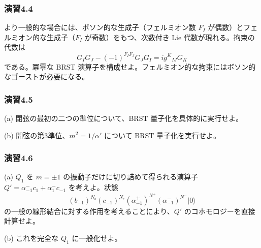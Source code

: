 \subsubsection*{演習4.4}\label{ex:4.4}
より一般的な場合には、ボソン的な生成子（フェルミオン数 $F_I$ が偶数）とフェルミオン的な生成子（$F_I$ が奇数）をもつ、次数付き Lie 代数が現れる。拘束の代数は
\[
G_IG_J-(-1)^{F_IF_J}G_JG_I=ig^K{}_{IJ}G_K
\]
である。冪零な BRST 演算子を構成せよ。フェルミオン的な拘束にはボソン的なゴーストが必要になる。

\subsubsection*{演習4.5}\label{ex:4.5}
(a) 閉弦の最初の二つの準位について、BRST 量子化を具体的に実行せよ。

(b) 開弦の第3準位、$m^2=1/\alpha'$ について BRST 量子化を実行せよ。

\subsubsection*{演習4.6}\label{ex:4.6}
(a) $Q_1$ を $m=\pm1$ の振動子だけに切り詰めて得られる演算子
$Q'=\alpha^-_{-1}c_1+\alpha^-_1c_{-1}$
を考えよ。状態
\[
(b_{-1})^{N_b}(c_{-1})^{N_c}
(\alpha^+_{-1})^{N^+}(\alpha^-_{-1})^{N^-}|0\rangle
\]
の一般の線形結合に対する作用を考えることにより、$Q'$ のコホモロジーを直接計算せよ。

(b) これを完全な $Q_1$ に一般化せよ。
